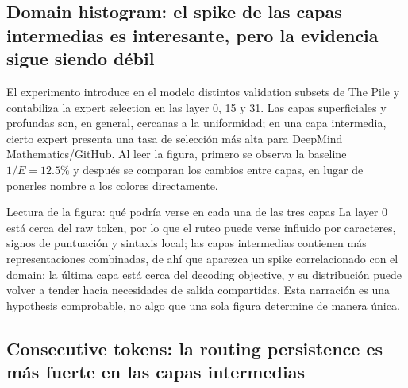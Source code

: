 
\subsection{Domain histogram: el spike de las capas intermedias es interesante, pero la evidencia sigue siendo débil}

El experimento introduce en el modelo distintos validation subsets de The Pile y contabiliza la expert selection en las layer 0, 15 y 31. Las capas superficiales y profundas son, en general, cercanas a la uniformidad; en una capa intermedia, cierto expert presenta una tasa de selección más alta para DeepMind Mathematics/GitHub. Al leer la figura, primero se observa la baseline $1/E=12.5\%$ y después se comparan los cambios entre capas, en lugar de ponerles nombre a los colores directamente.


\begin{knowledgebox}{Lectura de la figura: qué podría verse en cada una de las tres capas}
La layer 0 está cerca del raw token, por lo que el ruteo puede verse influido por caracteres, signos de puntuación y sintaxis local; las capas intermedias contienen más representaciones combinadas, de ahí que aparezca un spike correlacionado con el domain; la última capa está cerca del decoding objective, y su distribución puede volver a tender hacia necesidades de salida compartidas. Esta narración es una hypothesis comprobable, no algo que una sola figura determine de manera única.
\end{knowledgebox}


\subsection{Consecutive tokens: la routing persistence es más fuerte en las capas intermedias}

